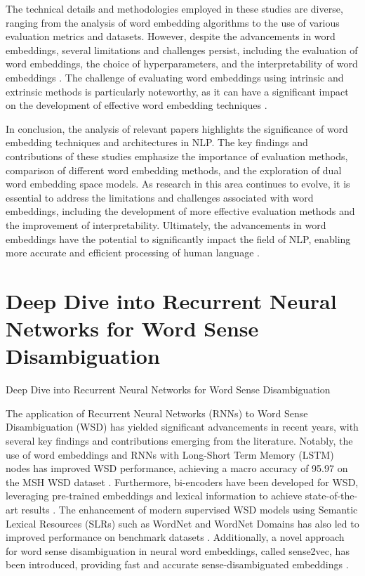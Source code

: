 \documentclass[conference]{IEEEtran}
\begin{document}
The technical details and methodologies employed in these studies are diverse, ranging from the analysis of word embedding algorithms to the use of various evaluation metrics and datasets. However, despite the advancements in word embeddings, several limitations and challenges persist, including the evaluation of word embeddings, the choice of hyperparameters, and the interpretability of word embeddings \cite{c3}. The challenge of evaluating word embeddings using intrinsic and extrinsic methods is particularly noteworthy, as it can have a significant impact on the development of effective word embedding techniques \cite{a1}.

In conclusion, the analysis of relevant papers highlights the significance of word embedding techniques and architectures in NLP. The key findings and contributions of these studies emphasize the importance of evaluation methods, comparison of different word embedding methods, and the exploration of dual word embedding space models. As research in this area continues to evolve, it is essential to address the limitations and challenges associated with word embeddings, including the development of more effective evaluation methods and the improvement of interpretability. Ultimately, the advancements in word embeddings have the potential to significantly impact the field of NLP, enabling more accurate and efficient processing of human language \cite{f6}.

\section{Deep Dive into Recurrent Neural Networks for Word Sense Disambiguation}
Deep Dive into Recurrent Neural Networks for Word Sense Disambiguation

The application of Recurrent Neural Networks (RNNs) to Word Sense Disambiguation (WSD) has yielded significant advancements in recent years, with several key findings and contributions emerging from the literature. Notably, the use of word embeddings and RNNs with Long-Short Term Memory (LSTM) nodes has improved WSD performance, achieving a macro accuracy of 95.97 on the MSH WSD dataset \cite{b1}. Furthermore, bi-encoders have been developed for WSD, leveraging pre-trained embeddings and lexical information to achieve state-of-the-art results \cite{b2}. The enhancement of modern supervised WSD models using Semantic Lexical Resources (SLRs) such as WordNet and WordNet Domains has also led to improved performance on benchmark datasets \cite{b3}. Additionally, a novel approach for word sense disambiguation in neural word embeddings, called sense2vec, has been introduced, providing fast and accurate sense-disambiguated embeddings \cite{b5}.
\end{document}
